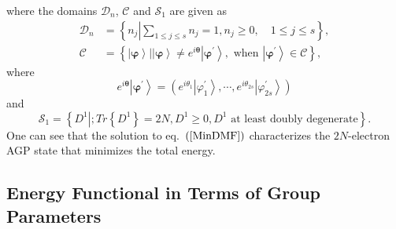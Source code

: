 \documentclass[aps,preprint]{revtex4}%
\begin{document}
where the domains $\mathcal{D}_{n}$, $\mathcal{C}$ and $\mathcal{S}_{1}$ are
given as%
\begin{align}
\mathcal{D}_{n}  &  =\left\{  n_{j}\left\vert \sum_{1\leq j\leq s}%
n_{j}=1,n_{j}\geq0,\quad1\leq j\leq s\right.  \right\}  ,\\
\mathcal{C}  &  =\left\{  \left.  \left\vert \bm{\varphi}\right\rangle
\right\vert \left\vert \bm{\varphi}\right\rangle \neq e^{i\bm{\theta }}%
\left\vert \bm{\varphi}^{\prime}\right\rangle ,\text{ when }\left\vert
\bm{\varphi}^{\prime}\right\rangle \in\mathcal{C}\right\}  ,
\end{align}
where
\begin{equation}
e^{i\bm{\theta}}\left\vert \bm{\varphi}^{\prime}\right\rangle =\left(
e^{i\theta_{1}}\left\vert \varphi_{1}^{\prime}\right\rangle ,\cdots
,e^{i\theta_{2s}}\left\vert \varphi_{2s}^{\prime}\right\rangle \right)
\end{equation}
and
\begin{equation}
\mathcal{S}_{1}=\left\{  \left.  D^{1}\right\vert ;Tr\left\{  D^{1}\right\}
=2N,D^{1}\geq0,D^{1}\text{ at least doubly degenerate}\right\}  .
\end{equation}
One can see that the solution to eq.\ $\left(  \ref{MinDMF}\right)  $
characterizes the $2N$-electron AGP state that minimizes the total energy.

\subsection{Energy Functional in Terms of Group Parameters\label{Group_Param}}
\end{document}
